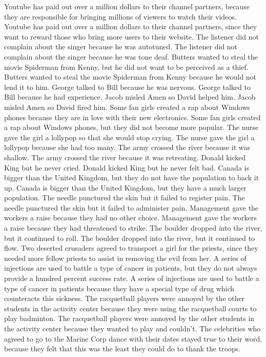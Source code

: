 \documentclass{article}
\begin{document}
\begin{enumerate}
Youtube has paid out over a million dollars to their channel partners, because they are responsible for bringing millions of viewers to watch their videos.
Youtube has paid out over a million dollars to their channel partners, since they want to reward those who bring more users to their website.
The listener did not complain about the singer because he was autotuned.
The listener did not complain about the singer because he was tone deaf.
Butters wanted to steal the movie Spiderman from Kenny, but he did not want to be perceived as a thief.
Butters wanted to steal the movie Spiderman from Kenny because he would not lend it to him.
George talked to Bill because he was nervous.
George talked to Bill because he had experience.
Jacob misled Amen so David helped him.
Jacob misled Amen so David fired him.
Some fan girls created a rap about Windows phones because they are in love with their new electronics.
Some fan girls created a rap about Windows phones, but they did not become more popular.
The nurse gave the girl a lollypop so that she would stop crying.
The nurse gave the girl a lollypop because she had too many.
The army crossed the river because it was shallow.
The army crossed the river because it was retreating.
Donald kicked King but he never cried.
Donald kicked King but he never felt bad.
Canada is bigger than the United Kingdom, but they do not have the population to back it up.
Canada is bigger than the United Kingdom, but they have a much larger population.
The needle punctured the skin but it failed to register pain.
The needle punctured the skin but it failed to administer pain.
Management gave the workers a raise because they had no other choice.
Management gave the workers a raise because they had threatened to strike.
The boulder dropped into the river, but it continued to roll.
The boulder dropped into the river, but it continued to flow.
Two deserted crusaders agreed to transport a girl for the priests, since they needed more fellow priests to assist in removing the evil from her.
A series of injections are used to battle a type of cancer in patients, but they do not always provide a hundred percent success rate.
A series of injections are used to battle a type of cancer in patients because they have a special type of drug which counteracts this sickness.
The racquetball players were annoyed by the other students in the activity center because they were using the racquetball courts to play badminton.
The racquetball players were annoyed by the other students in the activity center because they wanted to play and couldn't.
The celebrities who agreed to go to the Marine Corp dance with their dates stayed true to their word, because they felt that this was the least they could do to thank the troops.

\end{enumerate}
\end{document}
